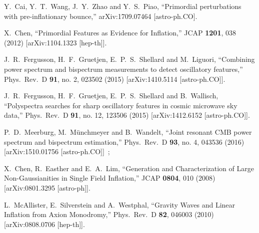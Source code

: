 \documentclass[12pt]{article}
\begin{document}
\begin{thebibliography}{99}
  
  
  Y.~Cai, Y.~T.~Wang, J.~Y.~Zhao and Y.~S.~Piao,
  ``Primordial perturbations with pre-inflationary bounce,''
  arXiv:1709.07464 [astro-ph.CO].
  
  X.~Chen,
  ``Primordial Features as Evidence for Inflation,''
  JCAP {\bf 1201}, 038 (2012)
  [arXiv:1104.1323 [hep-th]].
  
  
  J.~R.~Fergusson, H.~F.~Gruetjen, E.~P.~S.~Shellard and M.~Liguori,
  ``Combining power spectrum and bispectrum measurements to detect oscillatory features,''
  Phys.\ Rev.\ D {\bf 91}, no. 2, 023502 (2015)
  [arXiv:1410.5114 [astro-ph.CO]].
  
  J.~R.~Fergusson, H.~F.~Gruetjen, E.~P.~S.~Shellard and B.~Wallisch,
  ``Polyspectra searches for sharp oscillatory features in cosmic microwave sky data,''
  Phys.\ Rev.\ D {\bf 91}, no. 12, 123506 (2015)
  [arXiv:1412.6152 [astro-ph.CO]].
  
  P.~D.~Meerburg, M.~M\"unchmeyer and B.~Wandelt,
  ``Joint resonant CMB power spectrum and bispectrum estimation,''
  Phys.\ Rev.\ D {\bf 93}, no. 4, 043536 (2016)
  [arXiv:1510.01756 [astro-ph.CO]]~;
  
  
  
  
  
  X.~Chen, R.~Easther and E.~A.~Lim,
  ``Generation and Characterization of Large Non-Gaussianities in Single Field Inflation,''
  JCAP {\bf 0804}, 010 (2008)
  [arXiv:0801.3295 [astro-ph]].
 
  
 \cite{McAllister:2008hb}
  L.~McAllister, E.~Silverstein and A.~Westphal,
  ``Gravity Waves and Linear Inflation from Axion Monodromy,''
  Phys.\ Rev.\ D {\bf 82}, 046003 (2010)
  [arXiv:0808.0706 [hep-th]].
  

\end{thebibliography}
\end{document}
